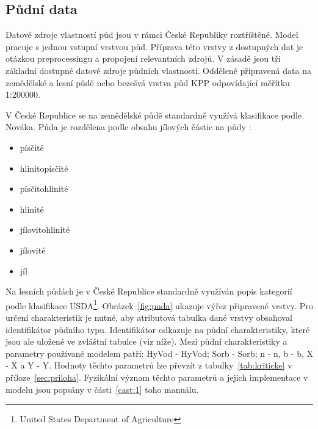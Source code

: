 % 

 
 
 
 
 
 
 
 
 
 
 
 
 
 
 
 
 
 
 
\subsection{Půdní data} \label{sec:vstuppuda}

Datové zdroje vlastností půd jsou v rámci České Republiky roztříštěné. Model \smod pracuje s jednou vstupní vrstvou půd. Příprava této vrstvy z dostupných dat je otázkou preprocessingu a propojení relevantních zdrojů. V zásadě jsou tři základní dostupné datové zdroje půdních vlastností. Odděleně připravená  data na zemědělské a lesní půdě nebo bezešvá vrstva půd KPP odpovídající měřítku 1:200000.

V České Republice se na zemědělské půdě standardně využívá klasifikace podle Nováka. Půda je rozdělena podle obsahu jílových částic na půdy \cite{kavka} :
\begin{itemize} \itemsep -3pt
  \item písčité
  \item hlinitopísčité
  \item písčitohlinité
  \item hlinité
  \item jílovitohlinité
  \item jílovité
  \item jíl
\end{itemize}

Na lesních půdách je v České Republice standardně využíván popis kategorií podle klasifikace USDA\footnote{United States Department of Agriculture}.
Obrázek~\ref{fig:puda} ukazuje výřez připravené vrstvy. Pro určení charakteristik je nutné, aby atributová tabulka dané vrstvy obsahoval identifikátor půdního typu. Identifikátor odkazuje na půdní charakteristiky, které jsou ale uložené ve zvláštní tabulce (viz níže). Mezi půdní charakteristiky a parametry používané modelem patří: \acs{HyVod} - \acl{HyVod}; \acs{Sorb} - \acl{Sorb}; \acs{n} - \acl{n}, \acs{b} - \acl{b}, \acs{X} - \acl{X} a  \acs{Y} - \acl{Y}. Hodnoty těchto parametrů lze převzít z tabulky~\ref{tab:kriticke} v příloze~\ref{sec:priloha}. Fyzikální význam těchto parametrů a jejich implementace v modelu jsou popsány v části~\ref{cast:1} toho manuálu. 





